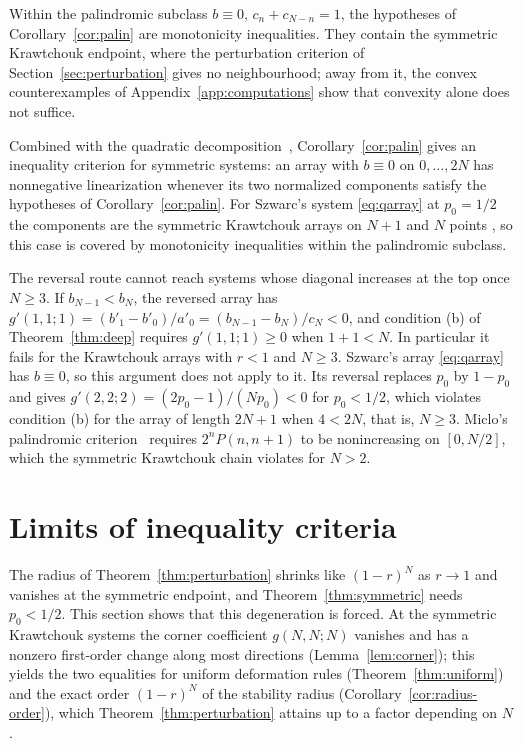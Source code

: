 Within the palindromic subclass $b\equiv0$, $c_n+c_{N-n}=1$, the hypotheses of Corollary~\ref{cor:palin} are monotonicity inequalities. They contain the symmetric Krawtchouk endpoint, where the perturbation criterion of Section~\ref{sec:perturbation} gives no neighbourhood; away from it, the convex counterexamples of Appendix~\ref{app:computations} show that convexity alone does not suffice.

Combined with the quadratic decomposition~\cite[Theorem~]{P1}, Corollary~\ref{cor:palin} gives an inequality criterion for symmetric systems: an array with $b\equiv0$ on $0,\ldots,2N$ has nonnegative linearization whenever its two normalized components satisfy the hypotheses of Corollary~\ref{cor:palin}. For Szwarc's system \eqref{eq:qarray} at $p_0=1/2$ the components are the symmetric Krawtchouk arrays on $N+1$ and $N$ points \cite[Corollary~]{P1}, so this case is covered by monotonicity inequalities within the palindromic subclass.

The reversal route cannot reach systems whose diagonal increases at the top once $N\geq3$. If $b_{N-1}<b_N$, the reversed array has $g'(1,1;1)=(b'_1-b'_0)/a'_0=(b_{N-1}-b_N)/c_N<0$, and condition (b) of Theorem~\ref{thm:deep} requires $g'(1,1;1)\geq0$ when $1+1<N$. In particular it fails for the Krawtchouk arrays with $r<1$ and $N\geq3$. Szwarc's array \eqref{eq:qarray} has $b\equiv0$, so this argument does not apply to it. Its reversal replaces $p_0$ by $1-p_0$ and gives $g'(2,2;2)=(2p_0-1)/(Np_0)<0$ for $p_0<1/2$, which violates condition (b) for the array of length $2N+1$ when $4<2N$, that is, $N\geq3$. Miclo's palindromic criterion~\cite[Theorem~31]{miclo2015} requires $2^nP(n,n+1)$ to be nonincreasing on $[0,N/2]$, which the symmetric Krawtchouk chain violates for $N>2$.

\section{Limits of inequality criteria}\label{sec:limits}

The radius of Theorem~\ref{thm:perturbation} shrinks like $(1-r)^N$ as $r\to1$ and vanishes at the symmetric endpoint, and Theorem~\ref{thm:symmetric} needs $p_0<1/2$. This section shows that this degeneration is forced. At the symmetric Krawtchouk systems the corner coefficient $g(N,N;N)$ vanishes and has a nonzero first-order change along most directions (Lemma~\ref{lem:corner}); this yields the two equalities for uniform deformation rules (Theorem~\ref{thm:uniform}) and the exact order $(1-r)^N$ of the stability radius (Corollary~\ref{cor:radius-order}), which Theorem~\ref{thm:perturbation} attains up to a factor depending on $N$.

